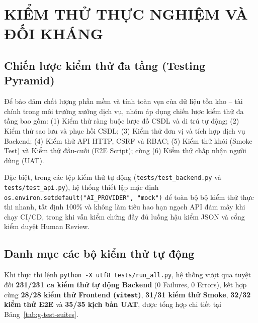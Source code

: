 \chapter{KIỂM THỬ THỰC NGHIỆM VÀ ĐỐI KHÁNG}

\section{Chiến lược kiểm thử đa tầng (Testing Pyramid)}

Để bảo đảm chất lượng phần mềm và tính toàn vẹn của dữ liệu tồn kho -- tài chính trong môi trường xưởng dịch vụ, nhóm áp dụng chiến lược kiểm thử đa tầng bao gồm: (1) Kiểm thử ràng buộc lược đồ CSDL và di trú tự động; (2) Kiểm thử sao lưu và phục hồi CSDL; (3) Kiểm thử đơn vị và tích hợp dịch vụ Backend; (4) Kiểm thử API HTTP, CSRF và RBAC; (5) Kiểm thử khói (Smoke Test) và Kiểm thử đầu-cuối (E2E Script); cùng (6) Kiểm thử chấp nhận người dùng (UAT).

Đặc biệt, trong các tệp kiểm thử tự động (\texttt{tests/test\_backend.py} và \texttt{tests/test\_api.py}), hệ thống thiết lập mặc định \texttt{os.environ.setdefault("AI\_PROVIDER", "mock")} để toàn bộ bộ kiểm thử thực thi nhanh, tất định 100\% và không làm tiêu hao hạn ngạch API đám mây khi chạy CI/CD, trong khi vẫn kiểm chứng đầy đủ luồng hậu kiểm JSON và cổng kiểm duyệt Human Review.

\section{Danh mục các bộ kiểm thử tự động}

Khi thực thi lệnh \texttt{python -X utf8 tests/run\_all.py}, hệ thống vượt qua tuyệt đối \textbf{231/231 ca kiểm thử tự động Backend} (0 Failures, 0 Errors), kết hợp cùng \textbf{28/28 kiểm thử Frontend (\texttt{vitest})}, \textbf{31/31 kiểm thử Smoke}, \textbf{32/32 kiểm thử E2E} và \textbf{35/35 kịch bản UAT}, được tổng hợp chi tiết tại Bảng~\ref{tab:g-test-suites}.

